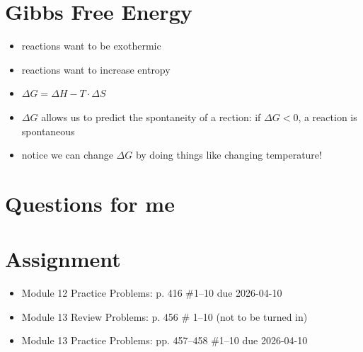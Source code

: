 \documentclass[10pt, oneside]{article}   	%
\begin{document}
\section*{Gibbs Free Energy}

\begin{itemize}
\item reactions want to be exothermic
\item reactions want to increase entropy
\item $\Delta G = \Delta H - T \cdot \Delta S$
\item $\Delta G$ allows us to predict the spontaneity of a rection: if $\Delta G < 0$, a reaction is spontaneous
\item notice we can change $\Delta G$ by doing things like changing temperature!
\end{itemize}


\section*{Questions for me}

\section*{Assignment}
\begin{itemize}
\item Module 12 Practice Problems: p. 416 \#1--10 due 2026-04-10
\item Module 13 Review Problems: p. 456 \# 1--10 (not to be turned in)
\item Module 13 Practice Problems: pp. 457--458 \#1--10 due 2026-04-10
\end{itemize}
\end{document}
